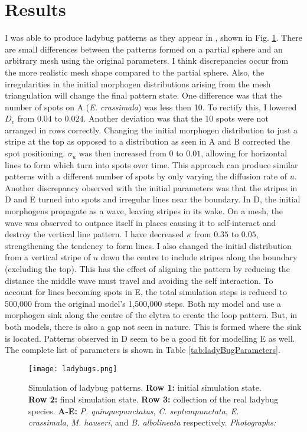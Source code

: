 \section{Results}
I was able to produce ladybug patterns as they appear in \citep{liaw2001}, shown in Fig. \ref{fig:ladyBugPatterns}. There are small differences between the patterns formed on a partial sphere and an arbitrary mesh using the original parameters. I think discrepancies occur from the more realistic mesh shape compared to the partial sphere. Also, the irregularities in the initial morphogen distributions arising from the mesh triangulation will change the final pattern state. One difference was that the number of spots on A (\textit{E. crassimala}) was less then 10. To rectify this, I lowered $D_v$ from $0.04$ to $0.024$. Another deviation was that the 10 spots were not arranged in rows correctly. Changing the initial morphogen distribution to just a stripe at the top as opposed to a distribution as seen in A and B corrected the spot positioning. $\sigma_u$ was then increased from $0$ to $0.01$, allowing for horizontal lines to form which turn into spots over time. This approach can produce similar patterns  with a different number of spots by only varying the diffusion rate of $u$. Another discrepancy observed with the initial parameters was that the stripes in D and E turned into spots and irregular lines near the boundary. In D, the initial morphogens propagate as a wave, leaving stripes in its wake. On a mesh, the wave was observed to outpace itself in places causing it to self-interact and destroy the vertical line pattern. I have decreased $\kappa$ from $0.35$ to $0.05$, strengthening the tendency to form lines. I also changed the initial distribution from a vertical stripe of $u$ down the centre to include stripes along the boundary (excluding the top). This has the effect of aligning the pattern by reducing the distance the middle wave must travel and avoiding the self interaction. To account for lines becoming spots in E, the total simulation steps is reduced to 500,000 from the original model's 1,500,000 steps. Both my model and \citep{liaw2001} use a morphogen sink along the centre of the elytra to create the loop pattern. But, in both models, there is also a gap not seen in nature. This is formed where the sink is located. Patterns observed in D seem to be a good fit for modelling E as well. The complete list of parameters is shown in Table \ref{tab:ladyBugParameters}.

\begin{figure}[!ht]
	\centering
	\texttt{[image: ladybugs.png]}
	\caption{Simulation of ladybug patterns. \textbf{Row 1:} initial simulation state. \textbf{Row 2:} final simulation state. \textbf{Row 3:} collection of the real ladybug species. \textbf{A-E:} \textit{P. quinquepunctatus}, \textit{C. septempunctata}, \textit{E. crassimala}, \textit{M. hauseri}, and \textit{B. albolineata} respectively. \textit{Photographs: \citep{chen2008}}}
	\label{fig:ladyBugPatterns}
\end{figure}

